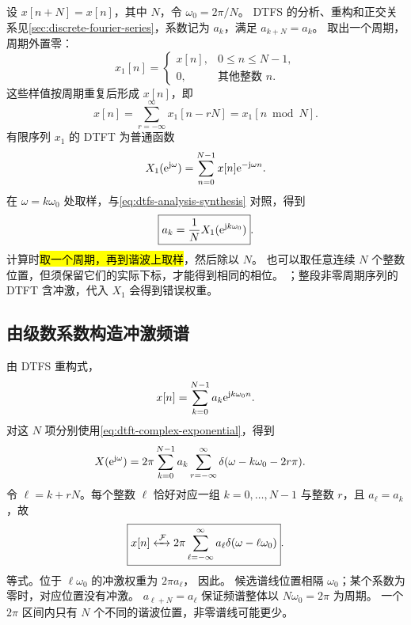 设 $x[n+N]=x[n]$，其中 $N$，令 $\omega_0=2\pi/N$。
DTFS 的分析、重构和正交关系见\cref{sec:discrete-fourier-series}，系数记为 $a_k$，满足 $a_{k+N}=a_k$。
取出一个周期，周期外置零：
\[
  x_1[n]=
  \begin{cases}
    x[n],&0\leq n\leq N-1,\\
    0,&\text{其他整数 }n.
  \end{cases}
\]
这些样值按周期重复后形成 $x[n]$，即
\begin{equation}
  x[n]=\sum_{r=-\infty}^{\infty}x_1[n-rN]
      =x_1[n\bmod N].
  \label{eq:dft-periodic-extension}
\end{equation}
有限序列 $x_1$ 的 DTFT 为普通函数
\[
  X_1(\mathrm{e}^{\mathrm{j}\omega})=\sum_{n=0}^{N-1}x[n]\mathrm{e}^{-\mathrm{j}\omega n}.
\]
在 $\omega=k\omega_0$ 处取样，与\cref{eq:dtfs-analysis-synthesis} 对照，得到
\begin{equation}
  \boxed{a_k=\frac1N X_1(\mathrm{e}^{\mathrm{j} k\omega_0})}.
  \label{eq:dtft-coefficient-from-transform}
\end{equation}
计算时\hl{取一个周期，再到谐波上取样}，然后除以 $N$。
也可以取任意连续 $N$ 个整数位置，但须保留它们的实际下标，才能得到相同的相位。
；整段非零周期序列的 DTFT 含冲激，代入 $X_1$ 会得到错误权重。

\subsection{由级数系数构造冲激频谱}
\label{sec:dtft-periodic-transform}

由 DTFS 重构式，
\[
  x[n]=\sum_{k=0}^{N-1}a_k\mathrm{e}^{\mathrm{j} k\omega_0n}.
\]
对这 $N$ 项分别使用\cref{eq:dtft-complex-exponential}，得到
\begin{align*}
  X(\mathrm{e}^{\mathrm{j}\omega})
  &=2\pi\sum_{k=0}^{N-1}a_k
    \sum_{r=-\infty}^{\infty}
      \delta(\omega-k\omega_0-2r\pi).
\end{align*}
令 $\ell=k+rN$。每个整数 $\ell$ 恰好对应一组 $k=0,\ldots,N-1$ 与整数 $r$，且 $a_\ell=a_k$，故
\begin{equation}
  \boxed{x[n]\mathrel{\xleftrightarrow{\,\mathcal{F}\,}}
    2\pi\sum_{\ell=-\infty}^{\infty}
      a_\ell\delta(\omega-\ell\omega_0)}.
  \label{eq:dtft-periodic-transform}
\end{equation}
等式。位于 $\ell\omega_0$ 的冲激权重为 $2\pi a_\ell$，
因此。
候选谱线位置相隔 $\omega_0$；某个系数为零时，对应位置没有冲激。
$a_{\ell+N}=a_\ell$ 保证频谱整体以 $N\omega_0=2\pi$ 为周期。
一个 $2\pi$ 区间内只有 $N$ 个不同的谐波位置，非零谱线可能更少。

